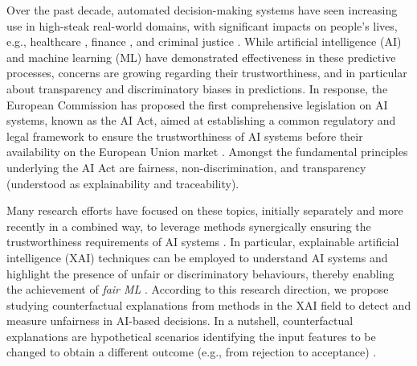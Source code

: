 \documentclass[letterpaper]{article} %
\begin{document}
Over the past decade, automated decision-making systems have seen increasing use in high-steak real-world domains, with significant impacts on people's lives, e.g., healthcare \cite{Morik10}, finance \cite{10.5555/573193}, and criminal justice \cite{angwin2016machine,DBLP:journals/corr/abs-1905-12728}. While artificial intelligence (AI) and machine learning (ML) have demonstrated effectiveness in these predictive processes, concerns are growing regarding their trustworthiness, and in particular about transparency and discriminatory biases in predictions.
%
In response, the European Commission has proposed the first comprehensive legislation on AI systems, known as the AI Act, aimed at establishing a common regulatory and legal framework to ensure the trustworthiness of AI systems before their availability on the European Union market \cite{europeancommission2021}. Amongst the fundamental principles underlying the AI Act are fairness, non-discrimination, and transparency (understood as explainability and traceability).

Many research efforts have focused on these topics, initially separately and more recently in a combined way, to leverage methods synergically ensuring the trustworthiness requirements of AI systems \cite{mucsanyi2023trustworthy}.
%
In particular, explainable artificial intelligence (XAI) techniques \cite{8466590} can be employed to understand AI systems and highlight the presence of unfair or discriminatory behaviours, thereby enabling the achievement of \textit{fair ML} \cite{10.1145/3616865}.
%
According to this research direction, we propose studying counterfactual explanations from methods in the XAI field to detect and measure unfairness in AI-based decisions. In a nutshell, counterfactual explanations are hypothetical scenarios identifying the input features to be changed to obtain a different outcome (e.g., from rejection to acceptance) \cite{guidotti2022counterfactual,10.1145/3527848}. 
\end{document}
